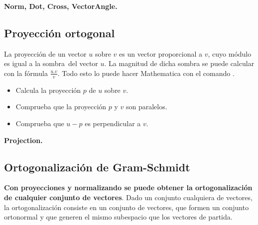 \documentclass[a4paper,10pt, draft]{article}
\newcommand{\com}[1]{\textbf{\color{blue}{#1}}}
\newenvironment{ejer}{\begin{tcolorbox}[center title, title=Ejercicios,
fonttitle=\sffamily\bfseries,colback=blue!5,colframe=orange]}{\end{tcolorbox}}
\newenvironment{funciones}{\begin{tcolorbox}[center title, title=Nuevas funciones, fonttitle=\sffamily\bfseries, colback=green!5!white,colframe=red!75!black]}{\end{tcolorbox}\bigskip}
\begin{document}
\begin{funciones}

\textbf{Norm, Dot, Cross, VectorAngle.}

\end{funciones}



\newpage

\subsection{Proyección ortogonal}

La proyección de un vector $u$ sobre $v$ es un vector proporcional a $v$, cuyo módulo es igual a la \guillemotleft sombra\guillemotright\ del vector $u$. La magnitud de dicha sombra se puede calcular con la fórmula $\frac{u.v}{v}$. Todo esto lo puede hacer Mathematica con el comando \com{Projection[u,v]}.

\begin{ejer}

\begin{itemize}

\item Calcula la proyección $p$ de $u$ sobre $v$.

\item Comprueba que la proyección $p$ y $v$ son paralelos.

\item Comprueba que $u-p$ es perpendicular a $v$.

\end{itemize}

\end{ejer}  

\begin{funciones}

\textbf{Projection.}


\end{funciones}




\newpage

\subsection{Ortogonalización de Gram-Schmidt}

\textbf{Con proyecciones y normalizando se puede obtener la ortogonalización de cualquier conjunto de vectores}.  Dado un conjunto cualquiera de vectores, la ortogonalización consiste en un conjunto de vectores, que formen un conjunto ortonormal y que generen el mismo subespacio que los vectores de partida.
\end{document}
